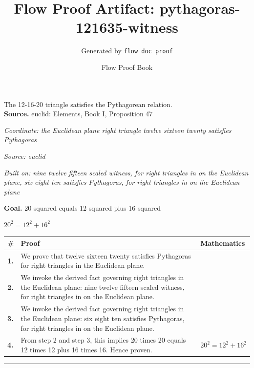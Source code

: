 \documentclass[11pt]{article}
\title{Flow Proof Artifact: pythagoras-121635-witness}
\author{Generated by \texttt{flow doc proof}}
\date{Flow Proof Book}
\theoremstyle{definition}
\begin{document}
\maketitle
The 12-16-20 triangle satisfies the Pythagorean relation.\\[0.5em]
\textbf{Source.} euclid: Elements, Book I, Proposition 47\\[0.5em]
\bigskip
{}\par
\smallskip\noindent\textit{Coordinate: the Euclidean plane \cdot right triangle \cdot twelve sixteen twenty satisfies Pythagoras}\par
\smallskip\noindent\textit{Source: euclid}\par
\smallskip\noindent\textit{Built on: nine twelve fifteen scaled witness, for right triangles in on the Euclidean plane, six eight ten satisfies Pythagoras, for right triangles in on the Euclidean plane}\par
\medskip
\noindent\textbf{Goal.} 20 squared equals 12 squared plus 16 squared\par
\noindent$\displaystyle 20^{2} = 12^{2} + 16^{2}$\par
\medskip
\noindent
\begin{tabular}{@{} >{\raggedright\arraybackslash}p{} >{\raggedright\arraybackslash}p{} >{\raggedleft\arraybackslash}p{} @{}}
\textbf{\#} & \textbf{Proof} & \textbf{Mathematics} \\
\midrule
\textbf{1.} & We prove that twelve sixteen twenty satisfies Pythagoras for right triangles in the Euclidean plane. & \\[0.45em]
\textbf{2.} & We invoke the derived fact governing right triangles in the Euclidean plane: nine twelve fifteen scaled witness, for right triangles in on the Euclidean plane. & \\[0.45em]
\textbf{3.} & We invoke the derived fact governing right triangles in the Euclidean plane: six eight ten satisfies Pythagoras, for right triangles in on the Euclidean plane. & \\[0.45em]
\textbf{4.} & From step 2 and step 3, this implies 20 times 20 equals 12 times 12 plus 16 times 16. Hence proven. & $\displaystyle 20^{2} = 12^{2} + 16^{2}$ \\[0.45em]
\bottomrule
\end{tabular}
\label{thm:Geometry-right triangle-twelve_sixteen_twenty_satisfies_pythagoras}
\par\medskip\hrule
\end{document}
